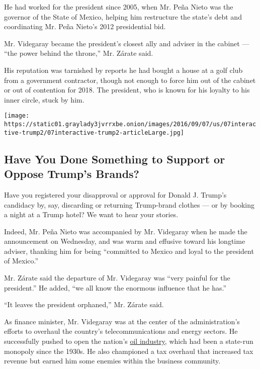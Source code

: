 He had worked for the president since 2005, when Mr. Peña Nieto was the
governor of the State of Mexico, helping him restructure the state's
debt and coordinating Mr. Peña Nieto's 2012 presidential bid.

Mr. Videgaray became the president's closest ally and adviser in the
cabinet --- ``the power behind the throne,'' Mr. Zárate said.

His reputation was tarnished by reports he had bought a house at a golf
club from a government contractor, though not enough to force him out of
the cabinet or out of contention for 2018. The president, who is known
for his loyalty to his inner circle, stuck by him.

\href{https://www.nytimes3xbfgragh.onion/interactive/2016/09/07/us/politics/trump-products-reaction.html}{}

\texttt{[image: https://static01.graylady3jvrrxbe.onion/images/2016/09/07/us/07interactive-trump2/07interactive-trump2-articleLarge.jpg]}

\hypertarget{have-you-done-something-to-support-or-oppose-trumps-brands}{%
\subsection{Have You Done Something to Support or Oppose Trump's
Brands?}\label{have-you-done-something-to-support-or-oppose-trumps-brands}}

Have you registered your disapproval or approval for Donald J. Trump's
candidacy by, say, discarding or returning Trump-brand clothes --- or by
booking a night at a Trump hotel? We want to hear your stories.

Indeed, Mr. Peña Nieto was accompanied by Mr. Videgaray when he made the
announcement on Wednesday, and was warm and effusive toward his longtime
adviser, thanking him for being ``committed to Mexico and loyal to the
president of Mexico.''

Mr. Zárate said the departure of Mr. Videgaray was ``very painful for
the president.'' He added, ``we all know the enormous influence that he
has.''

``It leaves the president orphaned,'' Mr. Zárate said.

As finance minister, Mr. Videgaray was at the center of the
administration's efforts to overhaul the country's telecommunications
and energy sectors. He successfully pushed to open the nation's
\href{http://www.nytimes3xbfgragh.onion/topic/subject/oil-and-gasoline?inline=nyt-classifier}{oil
industry}, which had been a state-run monopoly since the 1930s. He also
championed a tax overhaul that increased tax revenue but earned him some
enemies within the business community.

